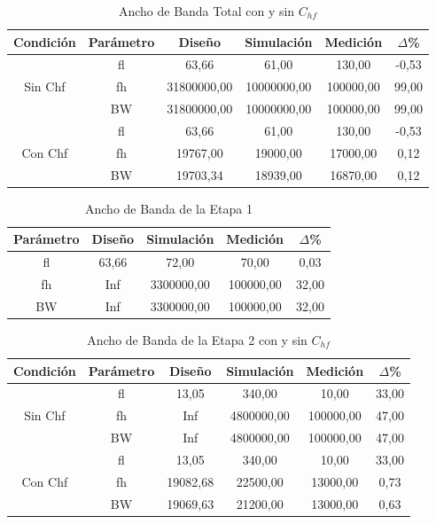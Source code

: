 \begin{table}[H]
\centering
\begin{tabular}{|c|c|c|c|c|c|}
\hline
\textbf{Condición} & \textbf{Parámetro} & \textbf{Diseño} & \textbf{Simulación} & \textbf{Medición} & \textbf{$\Delta$\%} \\ \hline
\multirow{3}{*}{Sin Chf} & fl & 63,66 & 61,00 & 130,00 & -0,53 \\ \cline{2-6} 
 & fh & 31800000,00 & 10000000,00 & 100000,00 & 99,00 \\ \cline{2-6} 
 & BW & 31800000,00 & 10000000,00 & 100000,00 & 99,00 \\ \hline
\multirow{3}{*}{Con Chf} & fl & 63,66 & 61,00 & 130,00 & -0,53 \\ \cline{2-6} 
 & fh & 19767,00 & 19000,00 & 17000,00 & 0,12 \\ \cline{2-6} 
 & BW & 19703,34 & 18939,00 & 16870,00 & 0,12 \\ \hline
\end{tabular}
\caption{Ancho de Banda Total con y sin $C_{hf}$}
\label{tab:ancho_de_banda}
\end{table}


\begin{table}[H]
\centering
\begin{tabular}{|c|c|c|c|c|}
\hline
\textbf{Parámetro} & \textbf{Diseño} & \textbf{Simulación} & \textbf{Medición} & \textbf{$\Delta$\%} \\ \hline
fl & 63,66 & 72,00 & 70,00 & 0,03 \\ \hline
fh & Inf & 3300000,00 & 100000,00 & 32,00 \\ \hline
BW & Inf & 3300000,00 & 100000,00 & 32,00 \\ \hline
\end{tabular}
\caption{Ancho de Banda de la Etapa 1}
\label{tab:ancho_de_banda_e1}
\end{table}


\begin{table}[H]
\centering
\begin{tabular}{|c|c|c|c|c|c|}
\hline
\textbf{Condición} & \textbf{Parámetro} & \textbf{Diseño} & \textbf{Simulación} & \textbf{Medición} & \textbf{$\Delta$\%} \\ \hline
\multirow{3}{*}{Sin Chf} & fl & 13,05 & 340,00 & 10,00 & 33,00 \\ \cline{2-6} 
 & fh & Inf & 4800000,00 & 100000,00 & 47,00 \\ \cline{2-6} 
 & BW & Inf & 4800000,00 & 100000,00 & 47,00 \\ \hline
\multirow{3}{*}{Con Chf} & fl & 13,05 & 340,00 & 10,00 & 33,00 \\ \cline{2-6} 
 & fh & 19082,68 & 22500,00 & 13000,00 & 0,73 \\ \cline{2-6} 
 & BW & 19069,63 & 21200,00 & 13000,00 & 0,63 \\ \hline
\end{tabular}
\caption{Ancho de Banda de la Etapa 2 con y sin $C_{hf}$}
\label{tab:ancho_de_banda_e2}
\end{table}

